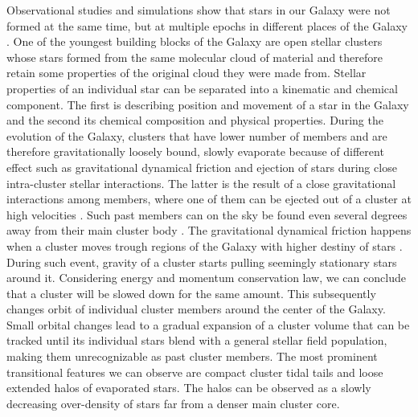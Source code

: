 Observational studies and simulations show that stars in our Galaxy were not formed at the same time, but at multiple epochs in different places of the Galaxy \cite{2001ApJ...554.1044C, 2017ARA&A..55...59N}. One of the youngest building blocks of the Galaxy are open stellar clusters whose stars formed from the same molecular cloud of material \cite{2003ARA&A..41...57L} and therefore retain some properties of the original cloud they were made from. Stellar properties of an individual star can be separated into a kinematic and chemical component. The first is describing position and movement of a star in the Galaxy and the second its chemical composition and physical properties. During the evolution of the Galaxy, clusters that have lower number of members and are therefore gravitationally loosely bound, slowly evaporate because of different effect such as gravitational dynamical friction and ejection of stars during close intra-cluster stellar interactions. The latter is the result of a close gravitational interactions among members, where one of them can be ejected out of a cluster at high velocities \cite{2009MNRAS.396..570G, 2010MNRAS.402..105G, 2017MNRAS.470.3049R}. Such past members can on the sky be found even several degrees away from their main cluster body \cite{2007MNRAS.376L..29G, 2018MNRAS.473.4612K, 2019ApJ...884....6M}. The gravitational dynamical friction happens when a cluster moves trough regions of the Galaxy with higher destiny of stars \cite{2010MNRAS.401.2753B}. During such event, gravity of a cluster starts pulling seemingly stationary stars around it. Considering energy and momentum conservation law, we can conclude that a cluster will be slowed down for the same amount. This subsequently changes orbit of individual cluster members around the center of the Galaxy. Small orbital changes lead to a gradual expansion of a cluster volume that can be tracked until its individual stars blend with a general stellar field population, making them unrecognizable as past cluster members. The most prominent transitional features we can observe are compact cluster tidal tails \cite{2019AA...627A...4R, 2019AJ....157..115Y, 2019AA...621L...3M, 2019arXiv191206657Z} and loose extended halos of evaporated stars. The halos can be observed as a slowly decreasing over-density \cite{2002A&A...385..471C, 2004A&A...427..485B, 2019AA...627A.119C} of stars far from a denser main cluster core.

